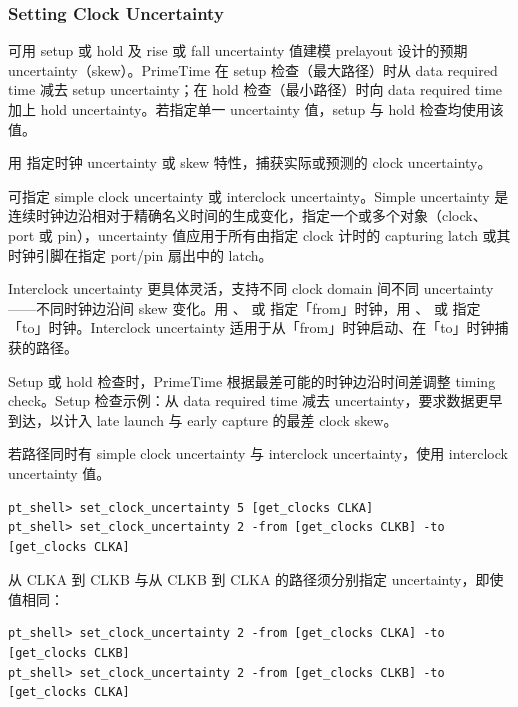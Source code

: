 \subsubsection*{Setting Clock Uncertainty}

可用 setup 或 hold 及 rise 或 fall uncertainty 值建模 prelayout 设计的预期 uncertainty（skew）。PrimeTime 在 setup 检查（最大路径）时从 data required time 减去 setup uncertainty；在 hold 检查（最小路径）时向 data required time 加上 hold uncertainty。若指定单一 uncertainty 值，setup 与 hold 检查均使用该值。

用  指定时钟 uncertainty 或 skew 特性，捕获实际或预测的 clock uncertainty。

可指定 simple clock uncertainty 或 interclock uncertainty。Simple uncertainty 是连续时钟边沿相对于精确名义时间的生成变化，指定一个或多个对象（clock、port 或 pin），uncertainty 值应用于所有由指定 clock 计时的 capturing latch 或其时钟引脚在指定 port/pin 扇出中的 latch。

Interclock uncertainty 更具体灵活，支持不同 clock domain 间不同 uncertainty——不同时钟边沿间 skew 变化。用 、 或  指定「from」时钟，用 、 或  指定「to」时钟。Interclock uncertainty 适用于从「from」时钟启动、在「to」时钟捕获的路径。


Setup 或 hold 检查时，PrimeTime 根据最差可能的时钟边沿时间差调整 timing check。Setup 检查示例：从 data required time 减去 uncertainty，要求数据更早到达，以计入 late launch 与 early capture 的最差 clock skew。

若路径同时有 simple clock uncertainty 与 interclock uncertainty，使用 interclock uncertainty 值。

\begin{lstlisting}
pt_shell> set_clock_uncertainty 5 [get_clocks CLKA]
pt_shell> set_clock_uncertainty 2 -from [get_clocks CLKB] -to [get_clocks CLKA]
\end{lstlisting}

从 CLKA 到 CLKB 与从 CLKB 到 CLKA 的路径须分别指定 uncertainty，即使值相同：
\begin{lstlisting}
pt_shell> set_clock_uncertainty 2 -from [get_clocks CLKA] -to [get_clocks CLKB]
pt_shell> set_clock_uncertainty 2 -from [get_clocks CLKB] -to [get_clocks CLKA]
\end{lstlisting}

